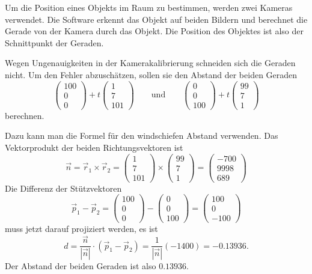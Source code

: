 Um die Position eines Objekts im Raum zu bestimmen, werden zwei Kameras
verwendet.
Die Software erkennt das Objekt auf beiden Bildern und berechnet
die Gerade von der Kamera durch das Objekt.
Die Position des Objektes ist also der Schnittpunkt der Geraden.

Wegen Ungenauigkeiten in der Kamerakalibrierung schneiden sich die Geraden
nicht. 
Um den Fehler abzuschätzen, sollen sie den Abstand der beiden Geraden
\[
\begin{pmatrix} 100\\0\\0 \end{pmatrix}
+
t\begin{pmatrix} 1\\7\\ 101\end{pmatrix}
\qquad\text{und}\qquad
\begin{pmatrix} 0\\0\\ 100 \end{pmatrix}
+
t\begin{pmatrix} 99\\7\\1 \end{pmatrix}
\]
berechnen.

\begin{loesung}
Dazu kann man die Formel für den windschiefen Abstand verwenden.
Das Vektorprodukt der beiden Richtungsvektoren ist
\[
\vec n
=
\vec r_1
\times
\vec r_2
=
\begin{pmatrix} 1\\7\\ 101\end{pmatrix}
\times
\begin{pmatrix} 99\\7\\1 \end{pmatrix}
=
\begin{pmatrix} -700\\9998\\689 \end{pmatrix}
\]
Die Differenz der Stützvektoren
\[
\vec p_1-\vec p_2
=
\begin{pmatrix} 100\\0\\0 \end{pmatrix}
-
\begin{pmatrix} 0\\0\\ 100 \end{pmatrix}
=
\begin{pmatrix} 100\\0\\-100 \end{pmatrix}
\]
muss jetzt darauf projiziert werden, es ist
\[
d
=
\frac{\vec n}{|\vec n|}\cdot (\vec p_1-\vec p_2)
=
\frac{1}{|\vec n|}(-1400)=-0.13936.
\]
Der Abstand der beiden Geraden ist also $0.13936$.
\end{loesung}


